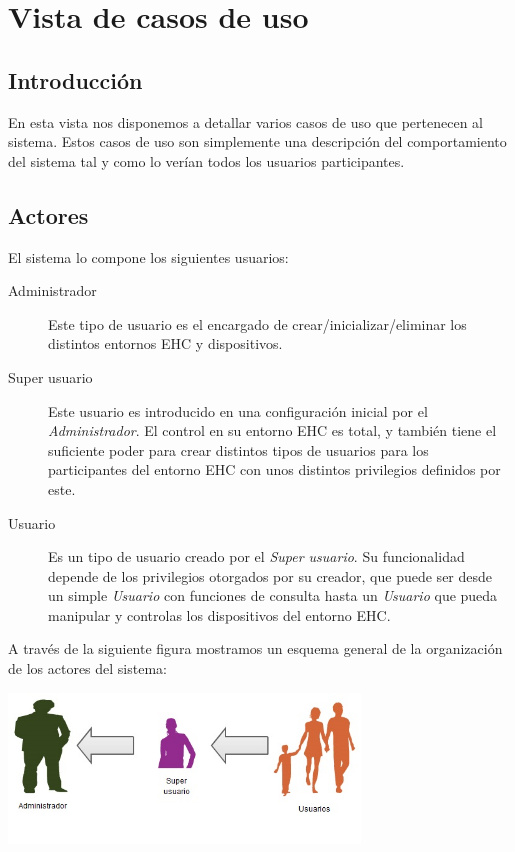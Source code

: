 \chapter{Vista de casos de uso}
\section{Introducción}
En esta vista nos disponemos a detallar varios casos de uso que pertenecen al sistema. Estos casos de uso son simplemente una descripción del comportamiento del sistema tal y como lo verían todos los usuarios participantes.

\section{Actores}
El sistema lo compone los siguientes usuarios:
\begin{description}
\item[Administrador] Este tipo de usuario es el encargado de crear/inicializar/eliminar los distintos entornos EHC y dispositivos.
\item[Super usuario] Este usuario es introducido en una configuración inicial por el \textit{Administrador}. El control en su entorno EHC es total, y también tiene el suficiente poder para crear distintos tipos de usuarios para los participantes del entorno EHC con unos distintos privilegios definidos por este. 
\item[Usuario] Es un tipo de usuario creado por el \textit{Super usuario}. Su funcionalidad depende de los privilegios otorgados por su creador, que puede ser desde un simple \textit{Usuario} con funciones de consulta hasta un \textit{Usuario} que pueda manipular y controlas los dispositivos del entorno EHC.
\end{description}

A través de la siguiente figura mostramos un esquema general de la organización de los actores del sistema:

\begin{center}
\includegraphics[width=0.7\textwidth]{4.Disenio/Imagenes/Actores}
\end{center}



